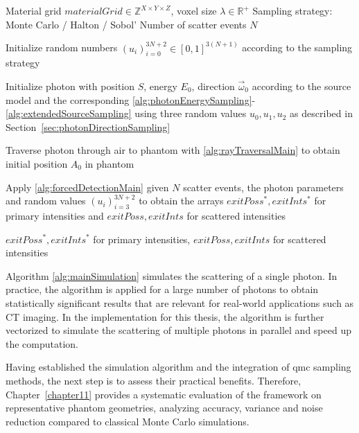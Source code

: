 \begin{algorithm}[H]
\caption{Photon Simulation Algorithm}
\label{alg:mainSimulation}
\begin{algorithmic}[1]
\Require Material grid $materialGrid \in \mathbb{Z}^{X \times Y \times Z}$, voxel size $\lambda \in \mathbb{R}^+$
\Require Sampling strategy: Monte Carlo / Halton / Sobol'
\Require Number of scatter events $N$

\State Initialize random numbers $(u_i)_{i=0}^{3N+2} \in [0,1]^{3(N+1)}$ according to the sampling strategy

\State Initialize photon with position $S$, energy $E_0$, direction
$\vec{\omega}_0$  according to the source model and the corresponding
\autoref{alg:photonEnergySampling}-\ref{alg:extendedSourceSampling} using three
random values $u_0,u_1,u_2$ as described in
Section~\ref{sec:photonDirectionSampling}

\State Traverse photon through air to phantom with \autoref{alg:rayTraversalMain} to obtain initial position $A_0$ in phantom

\State Apply \autoref{alg:forcedDetectionMain} given $N$ scatter events, the photon parameters and random values $(u_i)_{i=3}^{3N+2}$ to obtain the arrays $exitPoss^*, exitInts^*$ for primary intensities and $exitPoss, exitInts$ for scattered intensities

\State \Return $exitPoss^*, exitInts^*$ for primary intensities, $exitPoss, exitInts$ for scattered intensities
\end{algorithmic}
\end{algorithm}

Algorithm \ref{alg:mainSimulation} simulates the scattering of a single photon.
In practice, the algorithm is applied for a large number of photons to obtain
statistically significant results that are relevant for real-world applications
such as CT imaging. In the implementation for this thesis, the algorithm is
further vectorized to simulate the scattering of multiple photons in parallel
and speed up the computation.

\bigskip
Having established the simulation algorithm and the integration of \ac{qmc}
sampling methods, the next step is to assess their practical benefits.
Therefore, Chapter~\ref{chapter11} provides a systematic evaluation of the
framework on representative phantom geometries, analyzing accuracy, variance and
noise reduction compared to classical Monte Carlo simulations.
